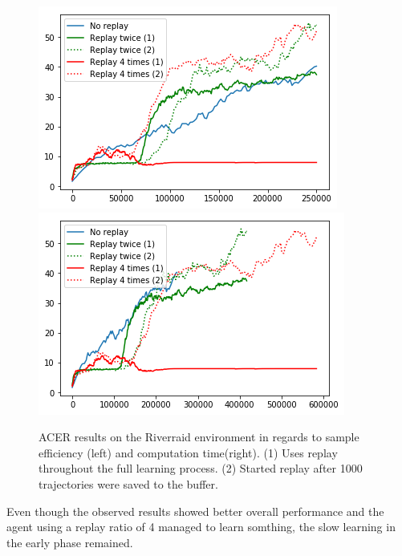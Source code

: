\begin{figure}[h]
\includegraphics[scale=0.55]{bilder/riverraidreplayonline.png}
\includegraphics[scale=0.55]{bilder/riverraidreplaytime.png}
\caption{ACER results on the Riverraid environment in regards to sample efficiency (left) and computation time(right). (1) Uses replay throughout the full learning process. (2) Started replay after 1000 trajectories were saved to the buffer.}
\end{figure}


Even though the observed results showed better overall performance and the agent using a replay ratio of 4 managed to learn somthing, the slow learning in the early phase remained.


